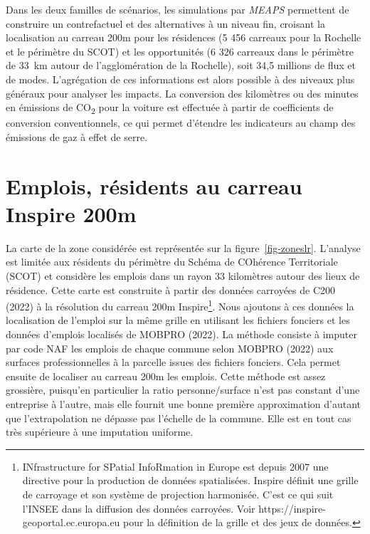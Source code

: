 \documentclass[
  10pt,
  a4paper,
  numbers=noendperiod,
  DIV=9]{scrartcl}
\begin{document}
Dans les deux familles de scénarios, les simulations par \emph{MEAPS}
permettent de construire un contrefactuel et des alternatives à un
niveau fin, croisant la localisation au carreau 200m pour les résidences
(5 456 carreaux pour la Rochelle et le périmètre du SCOT) et les
opportunités (6 326 carreaux dans le périmètre de 33~km autour de
l'agglomération de la Rochelle), soit 34,5 millions de flux et de modes.
L'agrégation de ces informations est alors possible à des niveaux plus
généraux pour analyser les impacts. La conversion des kilomètres ou des
minutes en émissions de CO\textsubscript{2} pour la voiture est
effectuée à partir de coefficients de conversion conventionnels, ce qui
permet d'étendre les indicateurs au champ des émissions de gaz à effet
de serre.

\hypertarget{emplois-ruxe9sidents-au-carreau-inspire-200m}{%
\section{Emplois, résidents au carreau Inspire
200m}\label{emplois-ruxe9sidents-au-carreau-inspire-200m}}

La carte de la zone considérée est représentée sur la
figure~\ref{fig-zoneslr}. L'analyse est limitée aux résidents du
périmètre du Schéma de COhérence Territoriale (SCOT) et considère les
emplois dans un rayon 33 kilomètres autour des lieux de résidence. Cette
carte est construite à partir des données carroyées de C200 (2022) à la
résolution du carreau 200m Inspire\footnote{INfrastructure for SPatial
  InfoRmation in Europe est depuis 2007 une directive pour la production
  de données spatialisées. Inspire définit une grille de carroyage et
  son système de projection harmonisée. C'est ce qui suit l'INSEE dans
  la diffusion des données carroyées. Voir
  https://inspire-geoportal.ec.europa.eu pour la définition de la grille
  et des jeux de données.}. Nous ajoutons à ces données la localisation
de l'emploi sur la même grille en utilisant les fichiers fonciers et les
données d'emplois localisés de MOBPRO (2022). La méthode consiste à
imputer par code NAF les emplois de chaque commune selon MOBPRO (2022)
aux surfaces professionnelles à la parcelle issues des fichiers
fonciers. Cela permet ensuite de localiser au carreau 200m les emplois.
Cette méthode est assez grossière, puisqu'en particulier la ratio
personne/surface n'est pas constant d'une entreprise à l'autre, mais
elle fournit une bonne première approximation d'autant que
l'extrapolation ne dépasse pas l'échelle de la commune. Elle est en tout
cas très supérieure à une imputation uniforme.
\end{document}

